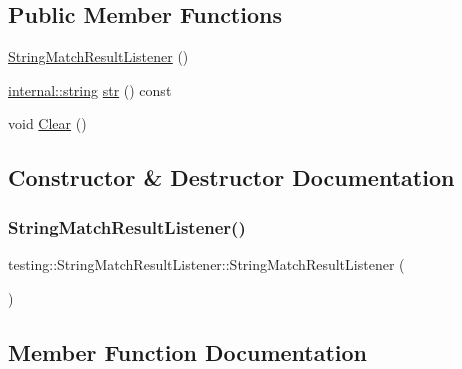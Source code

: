 \subsection*{Public Member Functions}
\begin{DoxyCompactItemize}
\item 
\hyperlink{classtesting_1_1_string_match_result_listener_a3894c8adca960a2f20a3db6a02b09238}{String\+Match\+Result\+Listener} ()
\item 
\hyperlink{namespacetesting_1_1internal_a8e8ff5b11e64078831112677156cb111}{internal\+::string} \hyperlink{classtesting_1_1_string_match_result_listener_ad1ed3c6b1077cc76b67567b33f5a2bd1}{str} () const
\item 
void \hyperlink{classtesting_1_1_string_match_result_listener_afd6e59e768516386a3908e7f5cc135d3}{Clear} ()
\end{DoxyCompactItemize}


\subsection{Constructor \& Destructor Documentation}
\mbox{\label{classtesting_1_1_string_match_result_listener_a3894c8adca960a2f20a3db6a02b09238}} 
\subsubsection{\texorpdfstring{String\+Match\+Result\+Listener()}{StringMatchResultListener()}}
{\footnotesize\ttfamily testing\+::\+String\+Match\+Result\+Listener\+::\+String\+Match\+Result\+Listener (\begin{DoxyParamCaption}{ }\end{DoxyParamCaption})\hspace{0.3cm}{\ttfamily [inline]}}



\subsection{Member Function Documentation}
\mbox{\label{classtesting_1_1_string_match_result_listener_afd6e59e768516386a3908e7f5cc135d3}} 
